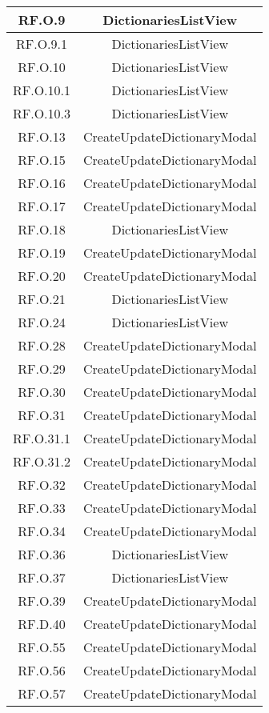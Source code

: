 \begin{adjustwidth}{-0.5cm}{-0.5cm}
\begin{longtable}{|c|c|}
    RF.O.9 & DictionariesListView \\
		\hline RF.O.9.1 & DictionariesListView \\
    \hline RF.O.10 & DictionariesListView \\
    \hline RF.O.10.1 & DictionariesListView \\
    \hline RF.O.10.3 & DictionariesListView \\
    \hline RF.O.13 & CreateUpdateDictionaryModal \\
    \hline RF.O.15 & CreateUpdateDictionaryModal \\
    \hline RF.O.16 & CreateUpdateDictionaryModal \\
    \hline RF.O.17 & CreateUpdateDictionaryModal \\
    \hline RF.O.18 & DictionariesListView \\
    \hline RF.O.19 & CreateUpdateDictionaryModal \\
    \hline RF.O.20 & CreateUpdateDictionaryModal \\
    \hline RF.O.21 & DictionariesListView \\
    \hline RF.O.24 & DictionariesListView \\
    \hline RF.O.28 & CreateUpdateDictionaryModal \\
    \hline RF.O.29 & CreateUpdateDictionaryModal \\
    \hline RF.O.30 & CreateUpdateDictionaryModal \\
    \hline RF.O.31 & CreateUpdateDictionaryModal \\
    \hline RF.O.31.1 & CreateUpdateDictionaryModal \\
    \hline RF.O.31.2 & CreateUpdateDictionaryModal \\
    \hline RF.O.32 & CreateUpdateDictionaryModal \\
    \hline RF.O.33 & CreateUpdateDictionaryModal \\
    \hline RF.O.34 & CreateUpdateDictionaryModal \\
    \hline RF.O.36 & DictionariesListView \\
    \hline RF.O.37 & DictionariesListView \\
    \hline RF.O.39 & CreateUpdateDictionaryModal \\
    \hline RF.D.40 & CreateUpdateDictionaryModal \\
    \hline RF.O.55 & CreateUpdateDictionaryModal \\
    \hline RF.O.56 & CreateUpdateDictionaryModal \\
    \hline RF.O.57 & CreateUpdateDictionaryModal \\
  \end{longtable}
\end{adjustwidth}
\egroup

